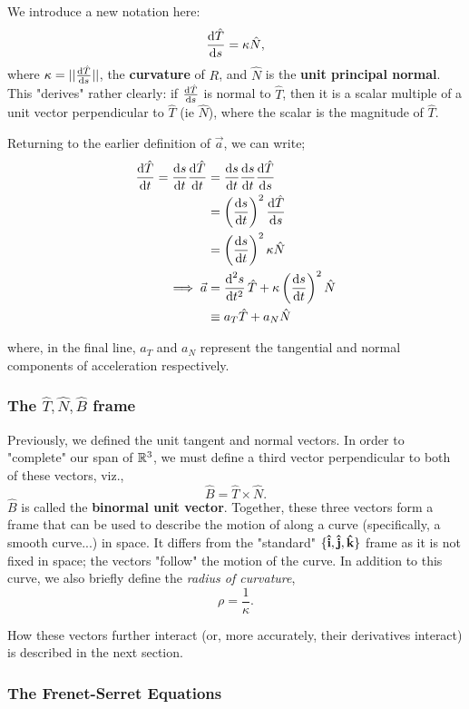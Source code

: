 \documentclass[12pt]{article}
\begin{document}
{We introduce a new notation here: \[\frac{\text{d}\hat{T}}{\text{d}s} = \kappa \hat{N},\] where $\kappa = ||\frac{\text{d}\hat{T}}{\text{d}s}||$, the \textbf{curvature} of $R$, and $\hat{N}$ is the \textbf{unit principal normal}. This "derives" rather clearly: if $\frac{\text{d}\hat{T}}{\text{d}s}$ is normal to $\hat{T}$, then it is a scalar multiple of a unit vector perpendicular to $\hat{T}$ (ie $\hat{N}$), where the scalar is the magnitude of $\hat{T}$.

Returning to the earlier definition of $\vec{a}$, we can write;
\begin{align*}
    \frac{\text{d}\hat{T}}{\text{d}t} = \frac{\text{d}s}{\text{d}t}\frac{\text{d}\hat{T}}{\text{d}t} &= \frac{\text{d}s}{\text{d}t}\frac{\text{d}s}{\text{d}t}\frac{\text{d}\hat{T}}{\text{d}s}\\
    &= \left(\frac{\text{d}s}{\text{d}t}\right)^2 \frac{\text{d}\hat{T}}{\text{d}s}\\
    &= \left(\frac{\text{d}s}{\text{d}t}\right)^2 \kappa \hat{N}\\
    \implies \vec{a} &= \frac{\text{d}^2s}{\text{d}t^2}\, \hat{T} + \kappa \left(\frac{\text{d}s}{\text{d}t}\right)^2 \hat{N}\\
    &\equiv a_T \hat{T} + a_N \hat{N}
\end{align*}

where, in the final line, $a_T$ and $a_N$ represent the tangential and normal components of acceleration respectively.

\subsubsection{The \texorpdfstring{$\hat{T}, \hat{N}, \hat{B}$}{T, N, B} frame}

Previously, we defined the unit tangent and normal vectors. In order to "complete" our span of $\mathbb{R}^3$, we must define a third vector perpendicular to both of these vectors, viz., \[\hat{B} = \hat{T} \times \hat{N}.\] $\hat{B}$ is called the \textbf{binormal unit vector}. Together, these three vectors form a frame that can be used to describe the motion of along a curve (specifically, a smooth curve...) in space. It differs from the "standard" $\{\vu{i}, \vu{j},\vu{k}\}$ frame as it is not fixed in space; the vectors "follow" the motion of the curve. In addition to this curve, we also briefly define the \textit{radius of curvature}, \[\rho = \frac{1}{\kappa}.\]

How these vectors further interact (or, more accurately, their derivatives interact) is described in the next section.

\subsubsection{The Frenet-Serret Equations}

}
\end{document}
